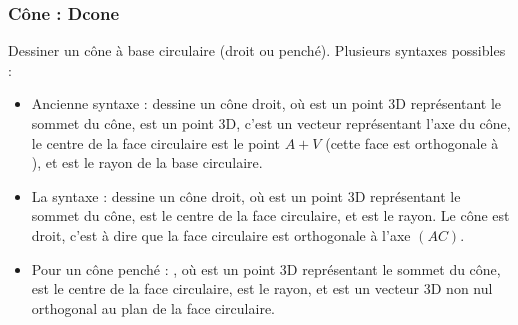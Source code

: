\subsubsection{Cône : Dcone}

Dessiner un cône à base circulaire (droit ou penché). Plusieurs syntaxes possibles :
\begin{itemize}
    \item Ancienne syntaxe :  dessine un cône droit, où  est un point 3D représentant le sommet du cône,  est un point 3D, c'est un vecteur représentant l'axe du cône, le centre de la face circulaire est le point $A+V$ (cette face est orthogonale à ), et  est le rayon de la base circulaire.
    
    \item La syntaxe :  dessine un cône droit, où  est un point 3D représentant le sommet du cône,  est le centre de la face circulaire, et  est le rayon. Le cône est droit, c'est à dire que la face circulaire est orthogonale à l'axe $(AC)$.
    
    \item Pour un cône penché : , où  est un point 3D représentant le sommet du cône,  est le centre de la face circulaire,  est le rayon, et  est un vecteur 3D non nul orthogonal au plan de la face circulaire.
\end{itemize}

